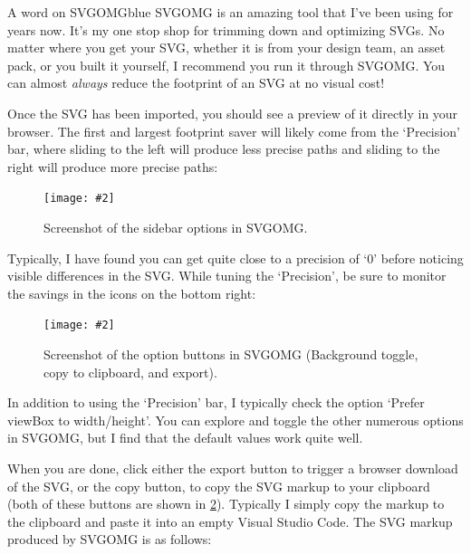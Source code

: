 \documentclass[paper=6in:9in,pagesize=pdftex,headinclude=on,footinclude=on,12pt]{scrbook}
\newcommand{\standardfigure}[3]{\begin{figure}[H]\begin{center}\texttt{[image: \#2]}\caption{#3}\label{fig:#2}\end{center}\end{figure}}
\begin{document}
\begin{highlightBox}{A word on SVGOMG}{blue}{\information}
SVGOMG is an amazing tool that I've been using for years now. It's my one stop shop for trimming down and optimizing SVGs. No matter where you get your SVG, whether it is from your design team, an asset pack, or you built it yourself, I recommend you run it through SVGOMG. You can almost \textit{always} reduce the footprint of an SVG at no visual cost!
\end{highlightBox}

Once the SVG has been imported, you should see a preview of it directly in your browser. The first and largest footprint saver will likely come from the `Precision' bar, where sliding to the left will produce less precise paths and sliding to the right will produce more precise paths:

\standardfigure{\textwidth}{frontend/logo-design/svgomg-precision-bar}{Screenshot of the sidebar options in SVGOMG.}

Typically, I have found you can get quite close to a precision of `0' before noticing visible differences in the SVG. While tuning the `Precision', be sure to monitor the savings in the icons on the bottom right:

\standardfigure{\textwidth}{frontend/logo-design/svgomg-icons}{Screenshot of the option buttons in SVGOMG (Background toggle, copy to clipboard, and export).}

In addition to using the `Precision' bar, I typically check the option `Prefer viewBox to width/height'. You can explore and toggle the other numerous options in SVGOMG, but I find that the default values work quite well.

When you are done, click either the export button to trigger a browser download of the SVG, or the copy button, to copy the SVG markup to your clipboard (both of these buttons are shown in \ref{fig:frontend/logo-design/svgomg-icons}). Typically I simply copy the markup to the clipboard and paste it into an empty Visual Studio Code. The SVG markup produced by SVGOMG is as follows:
\end{document}
